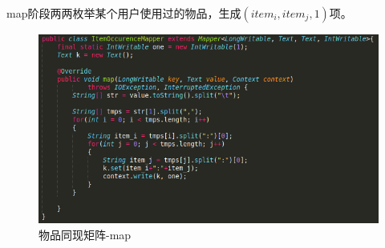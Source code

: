 \documentclass[12pt, a4paper]{article}
\begin{document}
\par map阶段两两枚举某个用户使用过的物品，生成$(item_i, item_j, 1)$项。
\begin{figure}[ht]
\centering
\includegraphics[scale=0.5]{m2.png}
\caption{物品同现矩阵-map}
\end{figure}

\newpage
\end{document}
